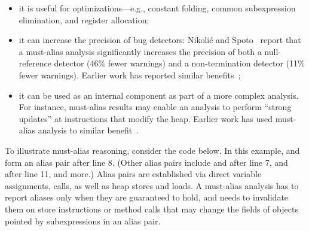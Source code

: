 \begin{itemize}
    \item it is useful for %
        optimizations---e.g., constant folding,
		common subexpression elimination, and register allocation;
	\item it can increase the precision of bug detectors: Nikoli\'{c} and
		Spoto~\cite{ictac:2012:Nikolic} report that a must-alias
		analysis significantly increases the precision of both a null-reference
		detector (46\% fewer warnings) and a non-termination detector (11\%
		fewer warnings). Earlier work has reported similar
		benefits~\cite{isola:2008:Ma};
	\item it can be used as an internal component as part of a more complex
		analysis. For instance, must-alias results may enable an analysis to
		perform ``strong updates'' at instructions that modify the heap.
		Earlier work has used must-alias analysis to similar
		benefit~\cite{pldi:1994:Emami,popl:1998:Jagannathan}.
\end{itemize}

To illustrate must-alias reasoning, consider 
the code below. In this example,  and  form an alias pair
after line 8. (Other alias pairs include  and  after line 7,
 and  after line 11, and more.)
Alias pairs are established via direct
variable assignments, calls, as well as heap stores and loads. A must-alias analysis
has to report aliases only when they are guaranteed to hold, and needs to
invalidate them on store instructions or method calls that may change the
fields of objects pointed by subexpressions in an alias pair.

